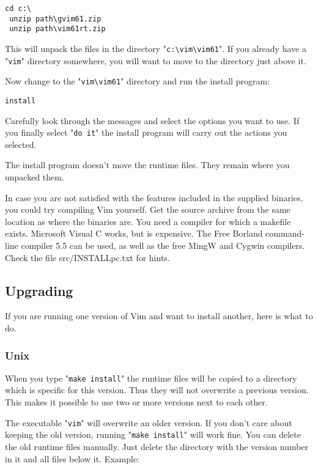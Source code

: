 \begin{Verbatim}[samepage=true]
 cd c:\
 unzip path\gvim61.zip
 unzip path\vim61rt.zip
\end{Verbatim}

This will unpack the files in the directory "\texttt{c:\textbackslash{}vim\textbackslash{}vim61}".
If you already have a "\texttt{vim}" directory somewhere, you will want to move to the directory just above it.

Now change to the "\texttt{vim\textbackslash{}vim61}" directory and run the install program:

\begin{Verbatim}[samepage=true]
 install
\end{Verbatim}

Carefully look through the messages and select the options you want to use.
If you finally select "\texttt{do it}" the install program will carry out the actions you selected.

The install program doesn't move the runtime files.
They remain where you unpacked them.

In case you are not satisfied with the features included in the supplied binaries, you could try compiling Vim yourself.
Get the source archive from the same location as where the binaries are.
You need a compiler for which a makefile exists.
Microsoft Visual C works, but is expensive.
The Free Borland command-line compiler 5.5 can be used, as well as the free MingW and Cygwin compilers.
Check the file src/INSTALLpc.txt for hints.
\subsection{Upgrading}
If you are running one version of Vim and want to install another, here is what to do.
\subsubsection{Unix}
When you type "\texttt{make install}" the runtime files will be copied to a directory which is specific for this version.
Thus they will not overwrite a previous version.
This makes it possible to use two or more versions next to each other.

The executable "\texttt{vim}" will overwrite an older version.
If you don't care about keeping the old version, running "\texttt{make install}" will work fine.
You can delete the old runtime files manually.
Just delete the directory with the version number in it and all files below it.
Example:

